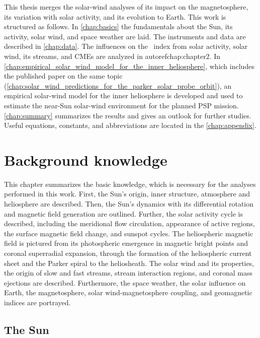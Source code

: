 This thesis merges the solar-wind analyses of its impact on the magnetosphere, its variation with solar activity, and its evolution to Earth. This work is structured as follows. In \autoref{chap:basics} the fundamentals about the Sun, its activity, solar wind, and space weather are laid. The instruments and data are described in \autoref{chap:data}. The influences on the \Kp{}~index from solar activity, solar wind, its streams, and CMEs are analyzed in autoref{chap:chapter2}. In \autoref{chap:empirical_solar_wind_model_for_the_inner_heliosphere}, which includes the published paper on the same topic (\autoref{chap:solar_wind_predictions_for_the_parker_solar_probe_orbit}), an empirical solar-wind model for the inner heliosphere is developed and used to estimate the near-Sun solar-wind environment for the planned PSP mission. \autoref{chap:summary} summarizes the results and gives an outlook for further studies. Useful equations, constants, and abbreviations are located in the \autoref{chap:appendix}.


\chapter{Background knowledge}
\label{chap:basics}
This chapter summarizes the basic knowledge, which is necessary for the analyses performed in this work. First, the Sun's origin, inner structure, atmosphere and heliosphere are described. Then, the Sun's dynamics with its differential rotation and magnetic field generation are outlined. Further, the solar activity cycle is described, including the meridional flow circulation, appearance of active regions, the surface magnetic field change, and sunspot cycles. The heliospheric magnetic field is pictured from its photospheric emergence in magnetic bright points and coronal superradial expansion, through the formation of the heliospheric current sheet and the Parker spiral to the heliosheath. The solar wind and its properties, the origin of slow and fast streams, stream interaction regions, and coronal mass ejections are described. Furthermore, the space weather, the solar influence on Earth, the magnetosphere, solar wind-magnetosphere coupling, and geomagnetic indices are portrayed.


\section{The Sun}
\label{sec:solar_composition}

